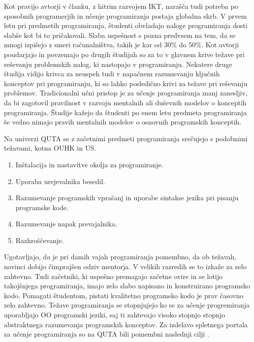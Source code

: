 
Kot pravijo avtorji v članku, z hitrim razvojem IKT, narašča tudi
potreba po sposobnih programerjih in učenje programiranja postaja
globalna skrb. V prvem letu pri predmetih programiranja, študenti
obvladajo naloge programiranja dosti slabše kot bi to
pričakovali. Slaba uspešnost s pozna predvsem na tem, da se mnogi
izpišejo z smeri računalništva, takih je kar od 30\% do 50\%. Kot
avtorji poudarjajo in povzemajo po drugih študijah so za to v glavnem
krive težave pri reševanju problemskih nalog, ki nastopajo v
programiranju. Nekatere druge študija vidijo krivca za neuspeh tudi v
napačnem razumevanju ključnih konceptov pri programiranju, ki so lahko
posledično krivi za težave pri reševanju problemov. Tradicionalni učni
pristop je za učenje programiranja manj zanesljiv, da bi zagotovil
pravilnost v razvoju mentalnih ali duševnih modelov o
konceptih programiranja. Študije kažejo da študenti po enem letu
predmeta programiranja še vedno nimajo pravih mentalnih modelov o
osnovnih programskih konceptih.

Na univerzi QUTA se z začetnimi predmeti programiranja srečujejo s
podobnimi težavami, kotna OUHK in US.

\begin{enumerate}
\tightlist
\item Inštalacija in nastavitve okolja za programiranje.
\item Uporaba urejevalnika besedil.
\item Razumevanje programskih vprašanj in uporabe sintakse jezika pri
  pisanju programske kode.
\item  Razumevanje napak prevajalnika.
\item Razhroščevanje.
\end{enumerate}

Ugotavljajo, da je pri damih vajah programiranja pomembno, da ob
težavah, novinci dobijo čimprajšen odziv mentorja. V velikih razredih
se to izkaže za zelo zahtevno. Tudi začetniki, ki uspešno premagajo
začetne ovire in se lotijo takojšnjega programiranja, imajo zelo slabo
napisano in konstruirano programsko kodo. Pomagati študentom, pistati
kvalitetno programsko kodo je prav časovno zelo zahtevno. Težave
programiranja se stopnjujejo ko se za učenje progremiranja uporabljajo
OO programski jeziki, saj ti zahtevajo visoko stopnjo stopnjo
abstraktnega razumevanja programskih konceptov. Za izdelavo spletnega
portala za učenje programiranja so na QUTA bili pomembni naslednji
cilji \cite{thesisAWebP}.

